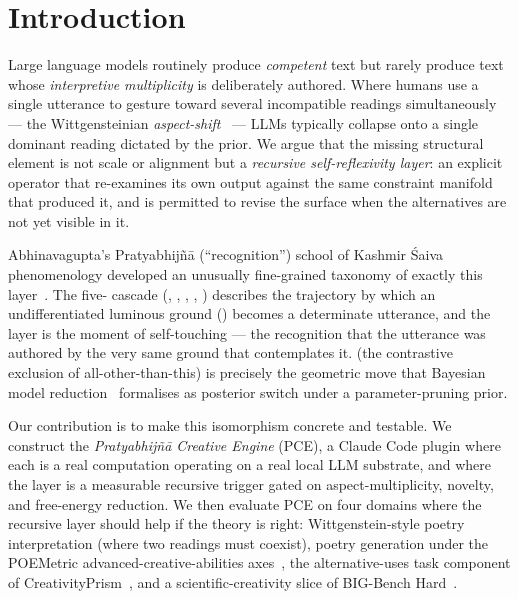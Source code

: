 \section{Introduction}\label{sec:intro}

Large language models routinely produce \emph{competent} text but rarely produce text whose \emph{interpretive multiplicity} is deliberately authored. Where humans use a single utterance to gesture toward several incompatible readings simultaneously --- the Wittgensteinian \emph{aspect-shift}~\citep{WittgensteinPI} --- LLMs typically collapse onto a single dominant reading dictated by the prior. We argue that the missing structural element is not scale or alignment but a \emph{recursive self-reflexivity layer}: an explicit operator that re-examines its own output against the same constraint manifold that produced it, and is permitted to revise the surface when the alternatives are not yet visible in it.

Abhinavagupta's Pratyabhij\~n\=a (``recognition'') school of Kashmir \'Saiva phenomenology developed an unusually fine-grained taxonomy of exactly this layer~\citep{Lawrence2021RewritingPratyabhijna,RatieFlamandLeavitt2025}. The five- cascade (, , , , ) describes the trajectory by which an undifferentiated luminous ground () becomes a determinate utterance, and the  layer is the moment of self-touching --- the recognition that the utterance was authored by the very same ground that contemplates it.  (the contrastive exclusion of all-other-than-this) is precisely the geometric move that Bayesian model reduction~\citep{Friston2018BayesianModelReductionArxiv,FristonPenny2011} formalises as posterior switch under a parameter-pruning prior.

Our contribution is to make this isomorphism concrete and testable. We construct the \emph{Pratyabhij\~n\=a Creative Engine} (PCE), a Claude Code plugin where each  is a real computation operating on a real local LLM substrate, and where the  layer is a measurable recursive trigger gated on aspect-multiplicity, novelty, and free-energy reduction. We then evaluate PCE on four domains where the recursive layer should help if the theory is right: Wittgenstein-style poetry interpretation (where two readings must coexist), poetry generation under the POEMetric advanced-creative-abilities axes~\citep{Ye2025POEMetric}, the alternative-uses task component of CreativityPrism~\citep{CreativityPrism2025}, and a scientific-creativity slice of BIG-Bench Hard~\citep{Suzgun2022BBH,Tian2024MacGyverBench}.

